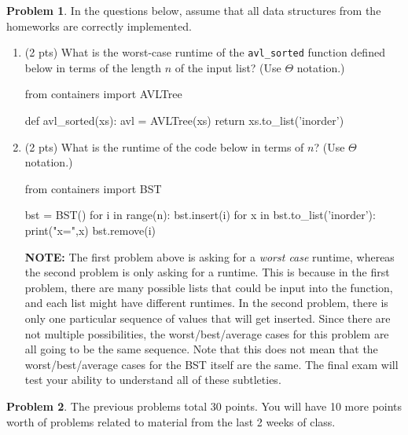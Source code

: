 \documentclass[12pt]{exam}
\newcommand*{\hl}[1]{\colorbox{yellow}{#1}}
\newcommand*{\answerLong}[2]{
    \ifprintanswers{\hl{#1}}
\else{#2}
\fi
}
\newcommand*{\answer}[1]{\answerLong{#1}{~}}
\theoremstyle{definition}
\newtheorem{problem}{Problem}
\begin{document}
\newpage
\begin{problem}
In the questions below, assume that all data structures from the homeworks are correctly implemented.
\begin{enumerate}
\item
(2 pts)
What is the worst-case runtime of the \lstinline{avl_sorted} function defined below in terms of the length $n$ of the input list?
(Use $\Theta$ notation.)
\begin{python}
from containers import AVLTree

def avl_sorted(xs):
    avl = AVLTree(xs)
    return xs.to_list('inorder')
\end{python}

\answer{$\Theta(n \log n)$}

\vspace{1.5in}
\item
(2 pts)
What is the runtime of the code below in terms of $n$?
(Use $\Theta$ notation.)
   
\begin{python}
from containers import BST

bst = BST()
for i in range(n):
    bst.insert(i)
    for x in bst.to_list('inorder'):
        print("x=",x)
    bst.remove(i)
\end{python}
\answer{$\Theta(n)$}

\vspace{1in}
\noindent
        \textbf{NOTE:}
The first problem above is asking for a \emph{worst case} runtime,
whereas the second problem is only asking for a runtime.
This is because in the first problem, there are many possible lists that could be input into the function, and each list might have different runtimes.
In the second problem, there is only one particular sequence of values that will get inserted.
Since there are not multiple possibilities, the worst/best/average cases for this problem are all going to be the same sequence.
Note that this does not mean that the worst/best/average cases for the BST itself are the same.
The final exam will test your ability to understand all of these subtleties.

\end{enumerate}
\end{problem}


\newpage
\begin{problem}
    The previous problems total 30 points.
    You will have 10 more points worth of problems related to material from the last 2 weeks of class. 
\end{problem}
\end{document}
